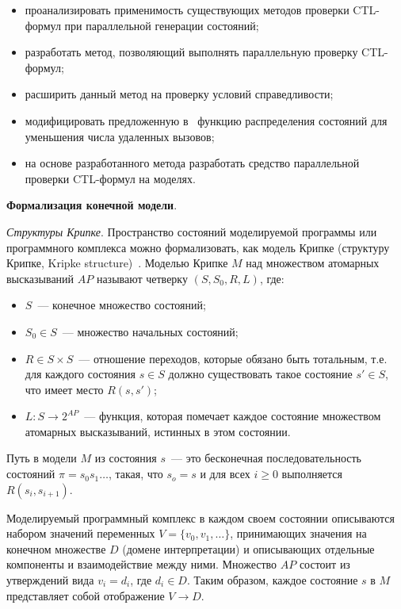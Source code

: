 \documentclass[a4paper,notitlepage,14pt]{article}
\begin{document}
\begin{itemize}
\item проанализировать применимость существующих методов проверки CTL-формул при
  параллельной генерации состояний;
\item разработать метод, позволяющий выполнять параллельную проверку CTL-формул;
\item расширить данный метод на проверку условий справедливости;
\item модифицировать предложенную в~\cite{Korotkov10Miem} функцию распределения состояний
  для уменьшения числа удаленных вызовов;
\item на основе разработанного метода разработать средство параллельной проверки
  CTL-формул на моделях.
\end{itemize}


\textbf{Формализация конечной модели}.

\textit{Структуры Крипке}. Пространство состояний моделируемой программы или программного
комплекса можно формализовать, как модель Крипке (структуру Крипке, Kripke
structure)~\cite{Clarke}. Моделью Крипке $M$ над множеством атомарных высказываний $AP$
называют четверку $(S, S_0, R, L)$, где:

\begin{itemize}
\item $S$~--- конечное множество состояний;
\item $S_0 \in S$~--- множество начальных состояний;
\item $R \in S \times S$~--- отношение переходов, которые обязано быть тотальным, т.е. для
  каждого состояния $s \in S$ должно существовать такое состояние $s' \in S$, что имеет
  место $R(s, s')$;
\item $L\colon S \rightarrow 2^{AP}$~--- функция, которая помечает каждое состояние
  множеством атомарных высказываний, истинных в этом состоянии.
\end{itemize}

Путь в модели $M$ из состояния $s$~--- это бесконечная последовательность состояний $\pi =
s_0 s_1 \ldots$, такая, что $s_o = s$ и для всех $i \geq 0$ выполняется $R(s_i, s_{i+1})$.

Моделируемый программный комплекс в каждом своем состоянии описываются набором значений
переменных $V = \{v_0, v_1, \ldots\}$, принимающих значения на конечном множестве $D$
(домене интерпретации) и описывающих отдельные компоненты и взаимодействие между
ними. Множество $AP$ состоит из утверждений вида $v_i = d_i$, где $d_i \in D$. Таким
образом, каждое состояние $s$ в $M$ представляет собой отображение $V \rightarrow D$.
\end{document}

